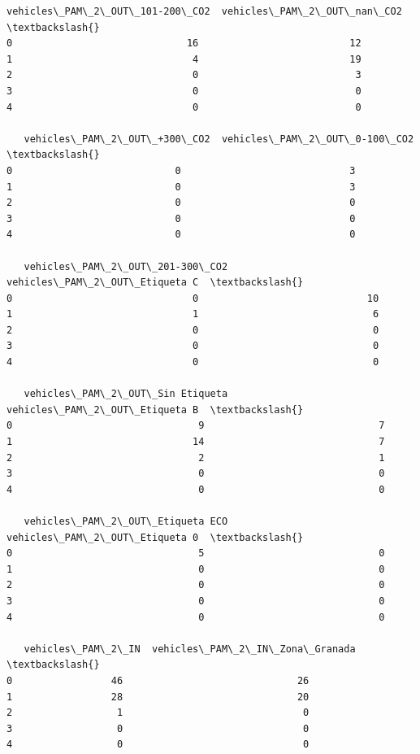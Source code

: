 \documentclass[11pt]{article}
\begin{document}
\begin{tcolorbox}[breakable, size=fbox, boxrule=.5pt, pad at break*=1mm, opacityfill=0]
\begin{Verbatim}[commandchars=\\\{\}]
   vehicles\_PAM\_2\_OUT\_101-200\_CO2  vehicles\_PAM\_2\_OUT\_nan\_CO2  \textbackslash{}
0                              16                          12
1                               4                          19
2                               0                           3
3                               0                           0
4                               0                           0

   vehicles\_PAM\_2\_OUT\_+300\_CO2  vehicles\_PAM\_2\_OUT\_0-100\_CO2  \textbackslash{}
0                            0                             3
1                            0                             3
2                            0                             0
3                            0                             0
4                            0                             0

   vehicles\_PAM\_2\_OUT\_201-300\_CO2  vehicles\_PAM\_2\_OUT\_Etiqueta C  \textbackslash{}
0                               0                             10
1                               1                              6
2                               0                              0
3                               0                              0
4                               0                              0

   vehicles\_PAM\_2\_OUT\_Sin Etiqueta  vehicles\_PAM\_2\_OUT\_Etiqueta B  \textbackslash{}
0                                9                              7
1                               14                              7
2                                2                              1
3                                0                              0
4                                0                              0

   vehicles\_PAM\_2\_OUT\_Etiqueta ECO  vehicles\_PAM\_2\_OUT\_Etiqueta 0  \textbackslash{}
0                                5                              0
1                                0                              0
2                                0                              0
3                                0                              0
4                                0                              0

   vehicles\_PAM\_2\_IN  vehicles\_PAM\_2\_IN\_Zona\_Granada  \textbackslash{}
0                 46                              26
1                 28                              20
2                  1                               0
3                  0                               0
4                  0                               0


\end{Verbatim}
\end{tcolorbox}
\end{document}
